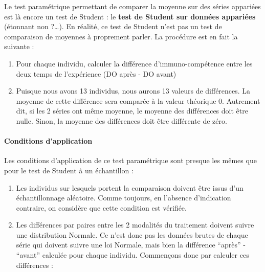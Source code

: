 \documentclass[a4paperpaper,]{article}
\newenvironment{Shaded}{\begin{snugshade}}{\end{snugshade}}
\newcommand{\DataTypeTok}[1]{\textcolor[rgb]{0.00,0.34,0.68}{#1}}
\newcommand{\KeywordTok}[1]{\textcolor[rgb]{0.12,0.11,0.11}{\textbf{#1}}}
\newcommand{\NormalTok}[1]{\textcolor[rgb]{0.12,0.11,0.11}{#1}}
\newcommand{\OperatorTok}[1]{\textcolor[rgb]{0.12,0.11,0.11}{#1}}
\newcommand{\StringTok}[1]{\textcolor[rgb]{0.75,0.01,0.01}{#1}}
\providecommand{\tightlist}{%
  \setlength{\itemsep}{0pt}\setlength{\parskip}{0pt}}
\let\oldparagraph\paragraph
\renewcommand{\paragraph}[1]{\oldparagraph{#1}\mbox{}}
\begin{document}
Le test paramétrique permettant de comparer la moyenne sur des séries appariées est là encore un test de Student : le \textbf{test de Student sur données appariées} (étonnant non ?\ldots{}). En réalité, ce test de Student n'est pas un test de comparaison de moyennes à proprement parler. La procédure est en fait la suivante :

\begin{enumerate}
\def\labelenumi{\arabic{enumi}.}
\tightlist
\item
  Pour chaque individu, calculer la différence d'immuno-compétence entre les deux temps de l'expérience (DO après - DO avant)
\item
  Puisque nous avons 13 individus, nous aurons 13 valeurs de différences. La moyenne de cette différence sera comparée à la valeur théorique 0. Autrement dit, si les 2 séries ont même moyenne, le moyenne des différences doit être nulle. Sinon, la moyenne des différences doit être différente de zéro.
\end{enumerate}

\hypertarget{conditions-dapplication-1}{%
\paragraph{Conditions d'application}\label{conditions-dapplication-1}}

Les conditions d'application de ce test paramétrique sont presque les mêmes que pour le test de Student à un échantillon :

\begin{enumerate}
\def\labelenumi{\arabic{enumi}.}
\tightlist
\item
  Les individus sur lesquels portent la comparaison doivent être issus d'un échantillonnage aléatoire. Comme toujours, en l'absence d'indication contraire, on considère que cette condition est vérifiée.
\item
  Les différences par paires entre les 2 modalités du traitement doivent suivre une distribution Normale. Ce n'est donc pas les données brutes de chaque série qui doivent suivre une loi Normale, mais bien la différence ``après'' - ``avant'' calculée pour chaque individu. Commençons donc par calculer ces différences :
\end{enumerate}

\begin{Shaded}
\end{Shaded}
\end{document}

